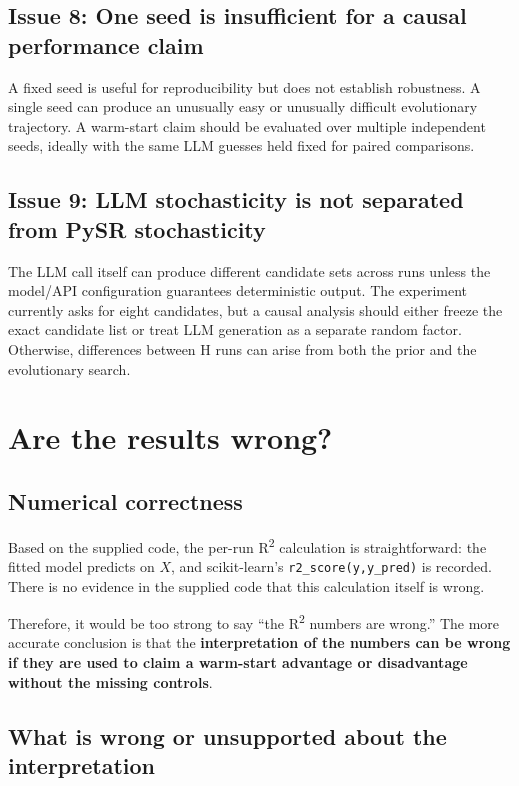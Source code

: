 \documentclass[11pt]{article}
\begin{document}
\subsection{Issue 8: One seed is insufficient for a causal performance claim}

A fixed seed is useful for reproducibility but does not establish robustness. A single seed can produce an unusually easy or unusually difficult evolutionary trajectory. A warm-start claim should be evaluated over multiple independent seeds, ideally with the same LLM guesses held fixed for paired comparisons.

\subsection{Issue 9: LLM stochasticity is not separated from PySR stochasticity}

The LLM call itself can produce different candidate sets across runs unless the model/API configuration guarantees deterministic output. The experiment currently asks for eight candidates, but a causal analysis should either freeze the exact candidate list or treat LLM generation as a separate random factor. Otherwise, differences between H runs can arise from both the prior and the evolutionary search.

\section{Are the results wrong?}

\subsection{Numerical correctness}

Based on the supplied code, the per-run R\textsuperscript{2} calculation is straightforward: the fitted model predicts on \(X\), and scikit-learn's \texttt{r2\_score(y,y\_pred)} is recorded. There is no evidence in the supplied code that this calculation itself is wrong.

Therefore, it would be too strong to say ``the R\textsuperscript{2} numbers are wrong.'' The more accurate conclusion is that the \textbf{interpretation of the numbers can be wrong if they are used to claim a warm-start advantage or disadvantage without the missing controls}.

\subsection{What is wrong or unsupported about the interpretation}
\end{document}
